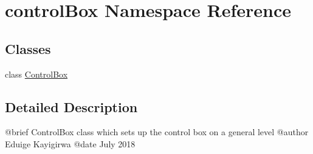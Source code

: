 \hypertarget{namespacecontrol_box}{}\section{control\+Box Namespace Reference}
\label{namespacecontrol_box}
\subsection*{Classes}
\begin{DoxyCompactItemize}
\item 
class \mbox{\hyperlink{classcontrol_box_1_1_control_box}{Control\+Box}}
\end{DoxyCompactItemize}


\subsection{Detailed Description}
\begin{DoxyVerb}@brief ControlBox class which sets up the control box on a general level
    @author Eduige Kayigirwa
    @date July 2018\end{DoxyVerb}
 
